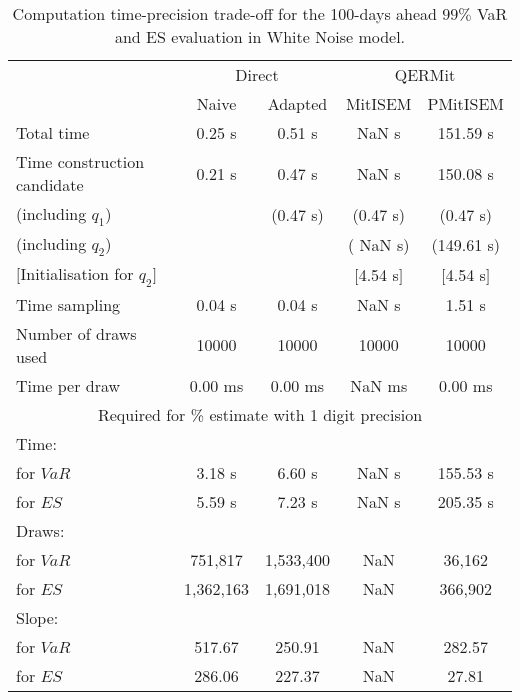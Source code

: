 { \renewcommand{\arraystretch}{1.3} 
\begin{table}[h] 
\centering 
\caption{Computation time-precision trade-off for the 100-days ahead  $99\%$ VaR and ES evaluation in White Noise model.} 
\label{tab:time_precision_WN} 
\begin{tabular}{lcccc}  
  & \multicolumn{2}{c}{Direct} & \multicolumn{2}{c}{QERMit}  \\ \cline{2-5} 
  & Naive & Adapted & MitISEM & PMitISEM  \\ \hline 
Total time & 0.25 s & 0.51 s &  NaN s & 151.59 s \\ 
Time construction candidate & 0.21 s & 0.47 s &  NaN s & 150.08 s \\ 
 (including $q_{1}$) &   &  (0.47 s) & (0.47 s) & (0.47 s) \\ 
 (including $q_{2}$) &   &  & ( NaN s) & (149.61 s) \\ 
$[$Initialisation for $q_{2}$$]$&   &   & $[$4.54 s$]$ & $[$4.54 s$]$ \\ 
Time sampling & 0.04 s & 0.04 s &  NaN s & 1.51 s  \\  
Number of draws used & 10000 & 10000 & 10000 & 10000 \\ 
Time per draw & 0.00 ms & 0.00 ms &  NaN ms & 0.00 ms \\ \hline 
\multicolumn{5}{c}{Required for \% estimate with 1 digit precision} \\ \hline 
Time: &  &  &   &  \\ 
\hspace{1cm} for $VaR$ & 3.18 s & 6.60 s &  NaN s & 155.53 s \\ 
\hspace{1cm} for $ES$ & 5.59 s & 7.23 s &  NaN s & 205.35 s \\ 
Draws: &  &  &   &  \\ 
\hspace{1cm} for $VaR$ & 751,817 & 1,533,400  & NaN  & 36,162  \\ 
\hspace{1cm} for $ES$ & 1,362,163 & 1,691,018  & NaN   & 366,902  \\ 
\hline 
Slope: &  &  &   &  \\ 
\hspace{1cm} for $VaR$ & 517.67 & 250.91  &  NaN  & 282.57  \\ 
\hspace{1cm} for $ES$ & 286.06 & 227.37  &  NaN   & 27.81  \\  \hline 
\end{tabular} 
\end{table} 
} 
